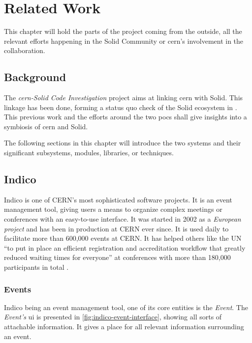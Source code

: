 \chapter{Related Work}

This chapter will hold the parts of the project coming from the outside, all the relevant efforts happening in the Solid Community or \gls{cern}'s involvement in the collaboration.

\section{Background}

The \textit{\gls{cern}-Solid Code Investigation} project \cite{cern-solid-code-investigation-project-description} aims at linking \gls{cern} with Solid. This linkage has been done, forming a status quo check of the Solid ecosystem in \cite{cern-solid-investigation-spec}. This previous work and the efforts around the two \glspl{poc} shall give insights into a symbiosis of \gls{cern} and Solid.

The following sections in this chapter will introduce the two systems and their significant subsystems, modules, libraries, or techniques. 

\section{Indico}

Indico is one of CERN’s most sophisticated software projects. It is an event management tool, giving users a means to organize complex meetings or conferences with an easy-to-use interface. It was started in 2002 as a \textit{European project} and has been in production at CERN ever since. It is used daily to facilitate more than 600,000 events at CERN. It has helped others like the UN “to put in place an efficient registration and accreditation workflow that greatly reduced waiting times for everyone” at conferences with more than 180,000 participants in total \cite{cern-solid-investigation-spec}.

\subsection{Events}

Indico being an event management tool, one of its core entities is the \textit{Event}. The \textit{Event's} \gls{ui} is presented in \ref{fig:indico-event-interface}, showing all sorts of attachable information. It gives a place for all relevant information surrounding an event.

